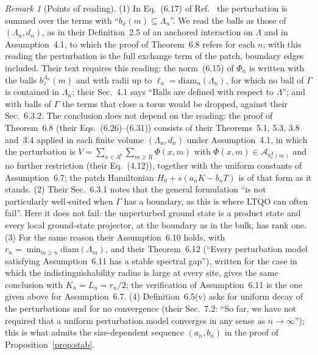 \documentclass[aps,prx,onecolumn,10pt,nofootinbib,longbibliography,floatfix]{revtex4-2}
\theoremstyle{remark}
\newtheorem*{remark}{Remark}
\begin{document}
\begin{remark}[Points of reading]
(1) In Eq.~(6.17) of Ref.~\cite{nsy2022} the perturbation is summed over the terms with ``$b_x(m)\subseteq\Lambda_n$''. %
We read the balls as those of $(\Lambda_n,d_n)$, as in their Definition~2.5 of an anchored interaction on $\Lambda$ %
and in Assumption~4.1, to which the proof of Theorem~6.8 refers for each $n$; with this reading the perturbation is %
the full exchange term of the patch, boundary edges included. Their text requires this reading: the
norm~(6.15) of $\Phi_n$ is written with the balls $b^{\Lambda_n}_z(m)$ and with radii up to %
$\ell_n=\mathrm{diam}_n(\Lambda_n)$, for which no ball of $\Gamma$ is contained in $\Lambda_n$; their Sec.~4.1 says %
``Balls are defined with respect to $\Lambda$''; and with balls of $\Gamma$ the terms that close a torus would be
dropped, against their Sec.~6.3.2. The conclusion does not depend on the reading: the proof of Theorem~6.8 (their %
Eqs.~(6.26)--(6.31)) consists of their Theorems~5.1, 5.3, 3.8 and~3.4 applied in each finite volume %
$(\Lambda_n,d_n)$ under Assumption~4.1, in which the perturbation is %
$V=\sum_{x\in\Lambda^p}\sum_{m\ge R}\Phi(x,m)$ with $\Phi(x,m)\in\mathcal A_{b^\Lambda_x(m)}$ and no further
restriction (their Eq.~(4.12)), together with the uniform constants of Assumption~6.7; the patch Hamiltonian %
$H_0+s(a_nK-b_nT)$ is of that form as it stands. (2) Their Sec.~6.3.1 notes that the general %
formulation ``is not particularly well-suited when $\Gamma$ has a boundary, as this is where LTQO can often fail''.
Here it does not fail: the unperturbed ground state is a product state and every local ground-state projector,
at the boundary as in the bulk, has rank one. (3) For the same reason their Assumption~6.10 holds, with %
$r_n=\min_{m\ge n}\mathrm{diam}(\Lambda_m)$, and their Theorem~6.12 (``Every perturbation model satisfying %
Assumption~6.11 has a stable spectral gap''), written for the case in which the indistinguishability radius is large %
at every site, gives the same conclusion with $K_n=L_n=r_n/2$; the verification of Assumption~6.11 is the one given %
above for Assumption~6.7. (4) Definition~6.5(v) asks for uniform decay of the perturbations and for no convergence %
(their Sec.~7.2: ``So far, we have not required that a uniform perturbation model converges in any sense as %
$n\to\infty$''); this is what admits the size-dependent sequence $(a_n,b_n)$ in the proof of
Proposition~\ref{prop:stab}.
\end{remark}
\end{document}
